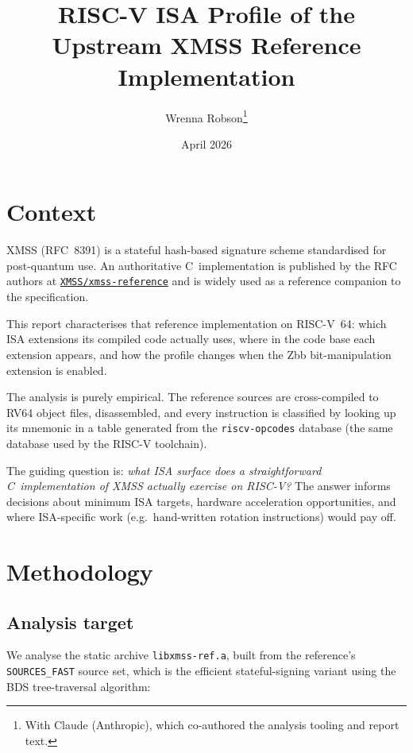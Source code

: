 \documentclass[11pt,a4paper]{article}
\title{RISC-V ISA Profile of the Upstream XMSS Reference Implementation}
\author{Wrenna Robson\thanks{With Claude (Anthropic), which co-authored
  the analysis tooling and report text.}}
\date{April 2026}
\begin{document}
\maketitle

\section{Context}

XMSS (RFC~8391) is a stateful hash-based signature scheme standardised
for post-quantum use.  An authoritative C~implementation is published
by the RFC authors at
\href{https://github.com/XMSS/xmss-reference}{\texttt{XMSS/xmss-reference}}
and is widely used as a reference companion to the specification.

This report characterises that reference implementation on RISC-V~64:
which ISA extensions its compiled code actually uses, where in the code
base each extension appears, and how the profile changes when the Zbb
bit-manipulation extension is enabled.

The analysis is purely empirical.  The reference sources are
cross-compiled to RV64 object files, disassembled, and every
instruction is classified by looking up its mnemonic in a table
generated from the \texttt{riscv-opcodes} database (the same
database used by the RISC-V toolchain).

The guiding question is: \emph{what ISA surface does a straightforward
C~implementation of XMSS actually exercise on RISC-V?}  The answer
informs decisions about minimum ISA targets, hardware acceleration
opportunities, and where ISA-specific work (e.g.\ hand-written
rotation instructions) would pay off.

\section{Methodology}

\subsection{Analysis target}

We analyse the static archive \texttt{libxmss-ref.a}, built from the
reference's \texttt{SOURCES\_FAST} source set, which is the efficient
stateful-signing variant using the BDS tree-traversal algorithm:
\end{document}
